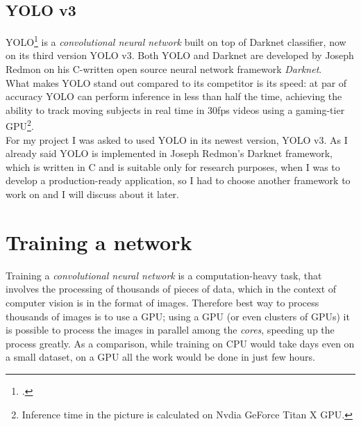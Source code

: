 \subsection{YOLO v3}
	YOLO\footcite{https://pjreddie.com/darknet/yolo/} is a \emph{convolutional neural network} built on top of Darknet classifier, now on its third version YOLO v3. Both YOLO and Darknet are developed by Joseph Redmon on his C-written open source neural network framework \emph{Darknet}. \\
	What makes YOLO stand out compared to its competitor is its speed: at par of accuracy YOLO can perform inference in less than half the time, achieving the ability to track moving subjects in real time in 30fps videos using a gaming-tier GPU\footnote{Inference time in the picture is calculated on Nvdia GeForce Titan X GPU.}. \\
	For my project I was asked to used YOLO in its newest version, YOLO v3. As I already said YOLO is implemented in Joseph Redmon's Darknet framework, which is written in C and is suitable only for research purposes, when I was to develop a production-ready application, so I had to choose another framework to work on and I will discuss about it later.
	
\section{Training a network}
	Training a \emph{convolutional neural network} is a computation-heavy task, that involves the processing of thousands of pieces of data, which in the context of computer vision is in the format of images. Therefore best way to process thousands of images is to use a GPU; using a GPU (or even clusters of GPUs) it is possible to process the images in parallel among the \emph{cores}, speeding up the process greatly. As a comparison, while training on CPU would take days even on a small dataset, on a GPU all the work would be done in just few hours.

